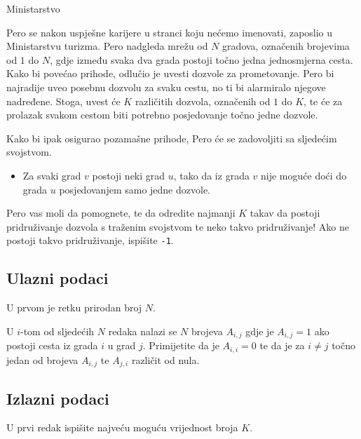 \begin{statement}[
  problempoints=100,
  timelimit=1 sekunda,
  memorylimit=1024 MiB,
]{Ministarstvo}

Pero se nakon uspješne karijere u stranci koju nećemo imenovati, zaposlio u Ministarstvu turizma. Pero nadgleda mrežu od $N$ gradova, označenih brojevima od $1$ do $N$, gdje između svaka dva grada postoji točno jedna jednosmjerna cesta. Kako bi povećao prihode, odlučio je uvesti dozvole za prometovanje. Pero bi najradije uveo posebnu dozvolu za svaku cestu, no ti bi alarmiralo njegove nadređene. Stoga, uvest će $K$ različitih dozvola, označenih od $1$ do $K$, te će za prolazak svakom cestom biti potrebno posjedovanje točno jedne dozvole. 

Kako bi ipak osigurao pozamašne prihode, Pero će se zadovoljiti sa sljedećim svojstvom.

\begin{itemize}
\item Za svaki grad $v$ postoji neki grad $u$, tako da iz grada $v$ nije moguće doći do grada $u$ posjedovanjem samo jedne dozvole.
\end{itemize} 

Pero vas moli da pomognete, te da odredite najmanji $K$ takav da postoji pridruživanje dozvola s traženim svojstvom te neko takvo pridruživanje! Ako ne postoji takvo pridruživanje, ispišite \texttt{-1}. 

\subsection*{Ulazni podaci}

U prvom je retku prirodan broj $N$.

U $i$-tom od sljedećih $N$ redaka nalazi se $N$ brojeva $A_{i, j}$ gdje je $A_{i, j} = 1$ ako postoji cesta iz grada $i$ u grad $j$. Primijetite da je $A_{i, i} = 0$ te da je za $i \neq j$ točno jedan od brojeva $A_{i, j}$ te $A_{j, i}$ različit od nula. 

\subsection*{Izlazni podaci}

U prvi redak ispišite najveću moguću vrijednost broja $K$.


\end{statement}
